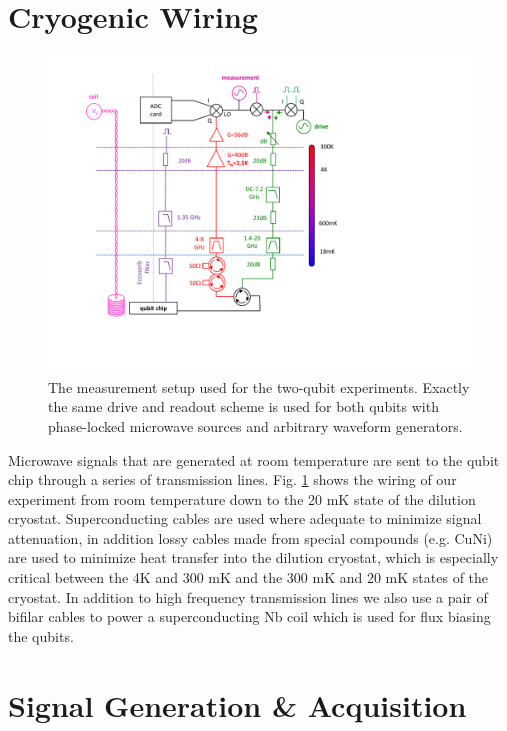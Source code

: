 \section{Cryogenic Wiring}

\begin{figure}[ht!]
	\centering
		\includegraphics[width=1.\textwidth]{"./material/figures/2-qubit-processor/measurement setup"}
	\caption[The measurement setup used for the two-qubit experiments]{The measurement setup used for the two-qubit experiments. Exactly the same drive and readout scheme is used for both qubits with phase-locked microwave sources and arbitrary waveform generators.}
	\label{fig:measurement_setup}
\end{figure}

Microwave signals that are generated at room temperature are sent to the qubit chip through a series of transmission lines. Fig. \ref{fig:measurement_setup} shows the wiring of our experiment from room temperature down to the 20 mK state of the dilution cryostat. Superconducting cables are used where adequate to minimize signal attenuation, in addition lossy cables made from special compounds (e.g. CuNi) are used to minimize heat transfer into the dilution cryostat, which is especially critical between the 4K and 300 mK and the 300 mK and 20 mK states of the cryostat. In addition to high frequency transmission lines we also use a pair of bifilar cables to power a superconducting Nb coil which is used for flux biasing the qubits.

\section{Signal Generation \& Acquisition}

